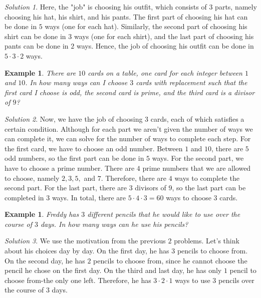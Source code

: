 \documentclass[letterpaper]{article}
\newtheorem{example}[thm]{Example}
\theoremstyle{remark}
\newtheorem*{solution}{Solution}
\theoremstyle{definition}
\begin{document}
\begin{solution}
Here, the "job" is choosing his outfit, which consists of $3$ parts, namely choosing his hat, his shirt, and his pants. The first part of choosing his hat can be done in $5$ ways (one for each hat). Similarly, the second part of choosing his shirt can be done in $3$ ways (one for each shirt), and the last part of choosing his pants can be done in $2$ ways. Hence, the job of choosing his outfit can be done in $5\cdot 3 \cdot 2$ ways.
\end{solution}
\bigskip
\begin{example}
There are $10$ cards on a table, one card for each integer between $1$ and $10$. In how many ways can I choose $3$ cards with replacement such that the first card I choose is odd, the second card is prime, and the third card is a divisor of $9$?
\end{example}

\begin{solution}
Now, we have the job of choosing $3$ cards, each of which satisfies a certain condition. Although for each part we aren't given the number of ways we can complete it, we can solve for the number of ways to complete each step. For the first card, we have to choose an odd number. Between $1$ and $10$, there are $5$ odd numbers, so the first part can be done in $5$ ways. For the second part, we have to choose a prime number. There are $4$ prime numbers that we are allowed to choose, namely $2, 3, 5, $ and $7$. Therefore, there are $4$ ways to complete the second part. For the last part, there are $3$ divisors of $9$, so the last part can be completed in $3$ ways. In total, there are $5\cdot 4 \cdot 3=60$ ways to choose $3$ cards.
\end{solution}
\bigskip
\begin{example}
Freddy has $3$ different pencils that he would like to use over the course of $3$ days. In how many ways can he use his pencils?
\end{example}

\begin{solution}
We use the motivation from the previous $2$ problems. Let's think about his choices day by day. On the first day, he has $3$ pencils to choose from. On the second day, he has $2$ pencils to choose from, since he cannot choose the pencil he chose on the first day. On the third and last day, he has only $1$ pencil to choose from-the only one left. Therefore, he has $3\cdot 2\cdot 1$ ways to use $3$ pencils over the course of $3$ days.
\end{solution}
\end{document}
